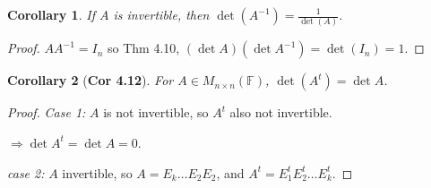 \documentclass[12pt]{article}
\newtheorem{corollary}{Corollary}[subsection]
\newcommand{\mF}{{\mathbb{F}}}
\begin{document}
\begin{corollary}
	If $A$ is invertible, then $\det(A^{-1}) = \frac1{\det(A)}$. 
\end{corollary}
\begin{proof}
	$AA^{-1} = I_n$ so Thm 4.10, $(\det A) (\det A^{-1}) = \det(I_n) = 1$. 
\end{proof}

\begin{corollary}[\textbf{Cor 4.12}]
	For $A \in M_{n\times n}(\mF)$, $\det(A^t) = \det A$. 
\end{corollary}
\begin{proof}
	\textit{Case 1:} 
	$A$ is not invertible, so $A^t$ also not invertible. 

	$\Rightarrow \det A^t = \det A = 0$. 

	\textit{case 2:} 
	$A$ invertible, so $A = E_k \ldots E_2 E_2$, and $A^t = E_1^t E_2^t \ldots
	E_k^t$. 
\end{proof}





\subsection{}
\end{document}
